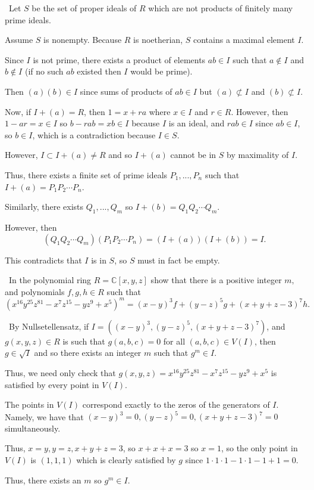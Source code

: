 \documentclass[12pt]{Qual}
\begin{document}
\begin{solution}$\,$
Let $S$ be the set of proper ideals of $R$ which are not products of finitely many prime ideals.

Assume $S$ is nonempty. Because $R$ is noetherian, $S$ contains a maximal element $I$.

Since $I$ is not prime, there exists a product of elements $ab\in I$ such that $a\notin I$ and $b\notin I$ (if no such $ab$ existed then $I$ would be prime).

Then $(a)(b)\in I$ since sums of products of $ab\in I$ but $(a)\not\subset I$ and $(b)\not\subset I$.

Now, if $I+(a)=R$, then $1=x+ra$ where $x\in I$ and $r\in R$. However, then $1-ar=x\in I$ so $b-rab=xb\in I$ because $I$ is an ideal, and $rab\in I$ since $ab\in I$, so $b\in I$, which is a contradiction because $I\in S$.

However, $I\subset I+(a)\not=R$ and so $I+(a)$ cannot be in $S$ by maximality of $I.$

Thus, there exists a finite set of prime ideals $P_1,...,P_n$ such that $I+(a)=P_1P_2\cdots P_n$.

Similarly, there exists $Q_1,...,Q_m$ so $I+(b)=Q_1Q_2\cdots Q_m$.

However, then $$(Q_1Q_2\cdots Q_m)(P_1P_2\cdots P_n)=(I+(a))(I+(b))=I.$$

This contradicts that $I$ is in $S$, so $S$ must in fact be empty.
\end{solution}
\newpage



\begin{problem} $\,$
In the polynomial ring $R=\mathbb{C}[x,y,z]$ show that there is a positive integer $m,$ and polynomials $f,g,h\in R$ such that $$(x^{16}y^{25}z^{81}-x^7z^{15}-yz^9+x^5)^m=(x-y)^3f+(y-z)^5g+(x+y+z-3)^7h.$$
\end{problem}


\begin{solution}$\,$
By Nullsetellensatz, if $I=((x-y)^3,(y-z)^5,(x+y+z-3)^7)$, and $g(x,y,z)\in R$ is such that $g(a,b,c)=0$ for all $(a,b,c)\in V(I)$, then $g\in\sqrt{I}$ and so there exists an integer $m$ such that $g^m\in I.$

Thus, we need only check that $g(x,y,z)=x^{16}y^{25}z^{81}-x^7z^{15}-yz^9+x^5$ is satisfied by every point in $V(I).$

The points in $V(I)$ correspond exactly to the zeros of the generators of $I$. Namely, we have that $(x-y)^3=0,(y-z)^5=0,(x+y+z-3)^7=0$ simultaneously.

Thus, $x=y,y=z,x+y+z=3$, so $x+x+x=3$ so $x=1$, so the only point in $V(I)$ is $(1,1,1)$ which is clearly satisfied by $g$ since $1\cdot 1\cdot 1-1\cdot 1-1+1=0.$

Thus, there exists an $m$ so $g^m\in I.$
\end{solution}
\newpage
\end{document}
